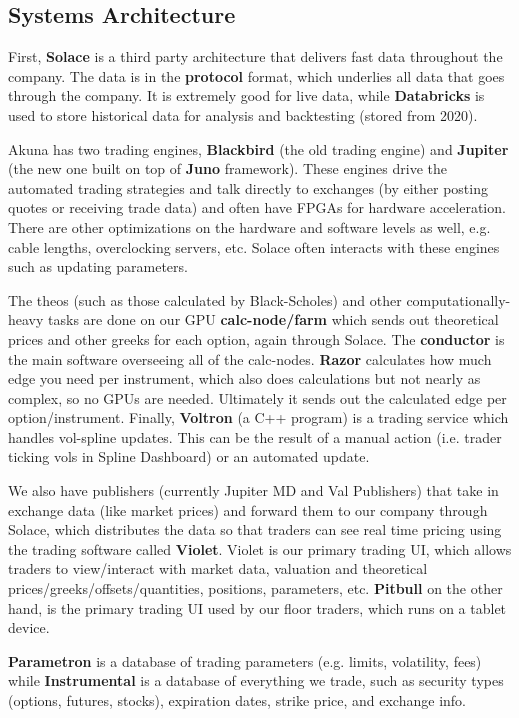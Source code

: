 \documentclass{article}
\begin{document}
  \subsection{Systems Architecture}

    First, \textbf{Solace} is a third party architecture that delivers fast data throughout the company. The data is in the \textbf{protocol} format, which underlies all data that goes through the company. It is extremely good for live data, while \textbf{Databricks} is used to store historical data for analysis and backtesting (stored from 2020).

    Akuna has two trading engines, \textbf{Blackbird} (the old trading engine) and \textbf{Jupiter} (the new one built on top of \textbf{Juno} framework). These engines drive the automated trading strategies and talk directly to exchanges (by either posting quotes or receiving trade data) and often have FPGAs for hardware acceleration. There are other optimizations on the hardware and software levels as well, e.g. cable lengths, overclocking servers, etc. Solace often interacts with these engines such as updating parameters.

    The theos (such as those calculated by Black-Scholes) and other computationally-heavy tasks are done on our GPU \textbf{calc-node/farm} which sends out theoretical prices and other greeks for each option, again through Solace. The \textbf{conductor} is the main software overseeing all of the calc-nodes. \textbf{Razor} calculates how much edge you need per instrument, which also does calculations but not nearly as complex, so no GPUs are needed. Ultimately it sends out the calculated edge per option/instrument. Finally, \textbf{Voltron} (a C++ program) is a trading service which handles vol-spline updates. This can be the result of a manual action (i.e. trader ticking vols in Spline Dashboard) or an automated update.

    We also have publishers (currently Jupiter MD and Val Publishers) that take in exchange data (like market prices) and forward them to our company through Solace, which distributes the data so that traders can see real time pricing using the trading software called \textbf{Violet}. Violet is our primary trading UI, which allows traders to view/interact with market data, valuation and theoretical prices/greeks/offsets/quantities, positions, parameters, etc. \textbf{Pitbull} on the other hand, is the primary trading UI used by our floor traders, which runs on a tablet device.

    \textbf{Parametron} is a database of trading parameters (e.g. limits, volatility, fees) while \textbf{Instrumental} is a database of everything we trade, such as security types (options, futures, stocks), expiration dates, strike price, and exchange info.
\end{document}
